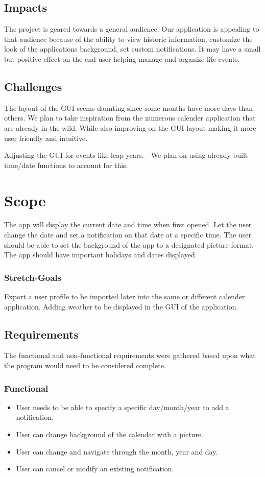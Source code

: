 \documentclass[10pt,conference,onecolumn,compsoc]{IEEEtran}
\begin{document}
\subsection{Impacts}

The project is geared towards a general audience. Our application is appealing to that audience because of the ability to view historic information, customize the look of the applications background, set custom notifications. It may have a small but positive effect on the end user helping manage and organize life events.

\subsection{Challenges}

The layout of the GUI seems daunting since some months have more days than others. We plan to take inspiration from the numerous calender application that are already in the wild. While also improving on the GUI layout making it more user friendly and intuitive.

Adjusting the GUI for events like leap years. - We plan on using already built time/date functions to account for this.


\section{Scope}
The app will display the current date and time when first opened. Let the user change the date and set a notification on that date at a specific time. The user should be able to set the background of the app to a designated picture format. The app should have important holidays and dates displayed. 

\subsubsection{Stretch-Goals}
Export a user profile to be imported later into the same or different calender application.
Adding weather to be displayed in the GUI of the application.

\subsection{Requirements}
The functional and non-functional requirements were gathered based upon what the program would need to be considered complete.

\subsubsection{Functional}
\begin{itemize}
\item User needs to be able to specify a specific day/month/year to add a notification.
\item User can change background of the calendar with a picture.
\item User can change and navigate through the month, year and day.
\item User can cancel or modify an existing notification.
\end{itemize}
\end{document}
